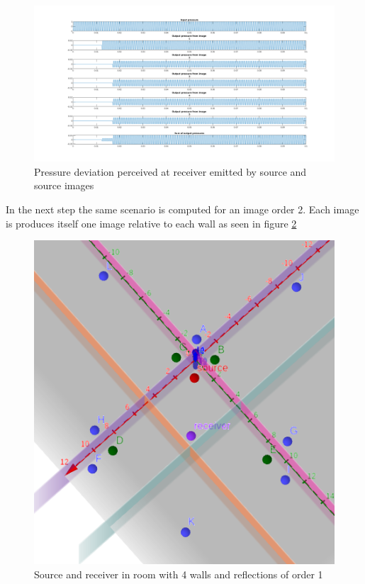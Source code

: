 \begin{figure}

    \centerline{\includegraphics[width=1.8\textwidth,keepaspectratio]{LaTeX/images/plots/matlab_4_walls_order_1.png}}
    \caption{Pressure deviation perceived at receiver emitted by source and source images}
    \label{fig:ism_4_1_mat}
\end{figure}
\newpage
In the next step the same scenario is computed for an image order 2. Each image is produces itself one image relative to each wall as seen in figure \ref{fig:ism_4_2_geo}\\
\begin{figure}
    \centerline{\includegraphics[width=1.3\textwidth,keepaspectratio]{LaTeX/images/geometrie/ism_4_walls_order_2.png}}
    \caption{Source and receiver in room with 4 walls and reflections of order 1}
    \label{fig:ism_4_2_geo}
\end{figure}